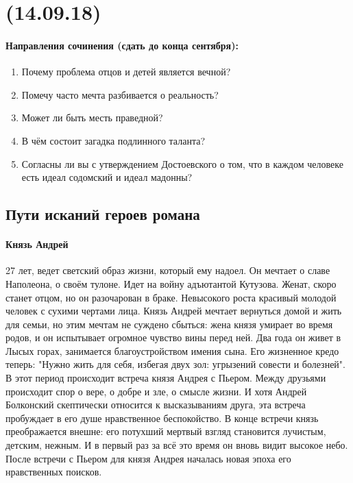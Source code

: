 \documentclass{article}
\begin{document}
\newpage
\noindent\makebox[\linewidth]{\rule{\paperwidth}{0.4pt}}
\section{(14.09.18)}
\noindent\makebox[\linewidth]{\rule{\paperwidth}{0.4pt}}
\paragraph{}

\paragraph{Направления сочинения (сдать до конца сентября):}

\begin{enumerate}
\item
  Почему проблема отцов и детей является вечной?
\item
  Помечу часто мечта разбивается о реальность?
\item
  Может ли быть месть праведной?
\item
  В чём состоит загадка подлинного таланта?
\item
  Согласны ли вы с утверждением Достоевского о том, что в каждом человеке есть идеал содомский и идеал мадонны?
\end{enumerate}
\paragraph{}

\subsection{Пути исканий героев романа}

\paragraph{Князь Андрей}
27 лет, ведет светский образ жизни, который ему надоел. Он мечтает о славе Наполеона, о своём тулоне.
Идет на войну адъютантой Кутузова. Женат, скоро станет отцом, но он разочарован в браке. Невысокого роста
красивый молодой человек с сухими чертами лица. Князь Андрей мечтает вернуться домой и жить для семьи, но
этим мечтам не суждено сбыться: жена князя умирает во время родов, и он испытывает огромное чувство вины перед ней.
Два года он живет в Лысых горах, занимается благоустройством имения сына. Его жизненное кредо теперь:
"Нужно жить для себя, избегая двух зол: угрызений совести и болезней". В этот период происходит встреча князя
Андрея с Пьером. Между друзьями происходит спор о вере, о добре и зле, о смысле жизни. И хотя Андрей Болконский
скептически относится к высказываниям друга, эта встреча пробуждает в его душе нравственное беспокойство.
В конце встречи князь преображается внешне: его потухший мертвый взгляд становится лучистым, детским, нежным.
И в первый раз за всё это время он вновь видит высокое небо. После встречи с Пьером для князя Андрея началась
новая эпоха его нравственных поисков. 
\end{document}
